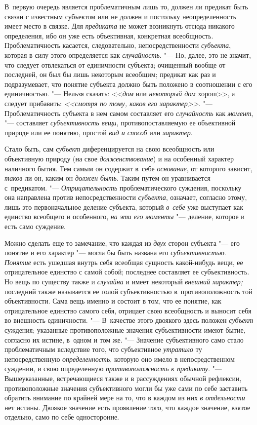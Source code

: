 \label{bkm:bm66a}В~первую очередь является проблематичным лишь
то, должен ли предикат быть связан с известным субъектом или не должен и
постольку неопределенность имеет место в связке. Для {\em предиката} не может
возникнуть отсюда никакого определения, ибо он уже есть объективная,
конкретная всеобщность. Проблематичность касается, следовательно,
непосредственности {\em субъекта}, которая в силу этого определяется как
{\em случайность}. "--- Но,
далее, это не значит, что следует отвлекаться от единичности субъекта;
очищенный вообще от последней, он был бы лишь некоторым всеобщим; предикат
как раз и подразумевает, что понятие субъекта должно быть положено в
соотношении с его единичностью. "--- Нельзя сказать: <<{\em дом} или
{\em некоторый дом} хорош>>, а следует прибавить: {\em <<смотря по тому,
каков его характер>>.} "--- Проблематичность субъекта в нем самом
составляет его {\em случайность} как {\em момент}, "--- составляет
{\em субъективность вещи}, противопоставляемую ее объективной природе
или ее понятию, простой {\em вид и способ} или {\em характер}.

Стало быть, сам {\em субъект} диференцируется на свою всеобщность или
объективную природу (на свое {\em долженствование})
и на особенный характер наличного бытия. Тем самым он
содержит в~себе {\em основание}, от которого зависит, {\em таков} ли он,
каким он {\em должен быть}. Таким путем он уравнивается
с~предикатом. "--- {\em Отрицательность} проблематического суждения,
поскольку она направлена против непосредственности {\em субъекта},
означает, согласно этому, лишь это первоначальное деление субъекта,
который {\em в~себе} уже выступает как единство всеобщего и особенного,
{\em на эти его моменты} "--- деление, которое и есть само суждение.

Можно сделать еще то замечание, что каждая из {\em двух} сторон
субъекта "--- его понятие и его характер "--- могла бы быть названа его
{\em субъективностью}. \label{bkm:bm01a}{\em Понятие}
есть ушедшая внутрь себя всеобщая сущность какой-нибудь вещи,
ее отрицательное единство с самой собой; последнее составляет ее
субъективность. Но вещь по существу также и {\em случайна} и имеет некоторый
{\em внешний характер;} последний также называется ее голой субъективностью
в~противоположность той объективности. Сама вещь именно и состоит в том, что
ее понятие, как отрицательное единство самого себя, отрицает свою
всеобщность и выносит себя во внешность
единичности. "--- В~качестве этого двоякого здесь положен {\em субъект}
суждения; указанные противоположные значения субъективности имеют бытие,
согласно их истине, в~одном и том же. "--- Значение субъективного само
стало проблематичным вследствие того, что субъективное {\em утратило} ту
непосредственную {\em определенность}, которую оно имело в непосредственном
суждении, и свою определенную {\em противоположность к
предикату}. "--- Вышеуказанные, встречающиеся также и
в рассуждениях обычной рефлексии, противоположные значения субъективного
могли бы уже сами по себе заставить обратить внимание по крайней мере на
то, что в каждом из них {\em в отдельности} нет истины. Двоякое значение
есть проявление того, что каждое значение, взятое отдельно, само по себе
односторонне.

